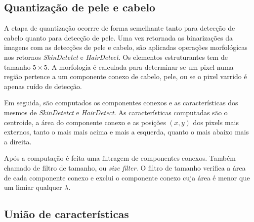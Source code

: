 \documentclass[journal,onecolumn]{IEEEtran}
\begin{document}
	\subsection{Quantização de pele e cabelo}
	
	A etapa de quantização ocorrre de forma semelhante tanto para detecção de cabelo quanto para detecção de pele.
	Uma vez retornada as binarizações da imagens com as detecções de pele e cabelo, são aplicadas operações morfológicas nos retornos \textit{SkinDetetct} e \textit{HairDetect}.
 	Os elementos estruturantes tem de tamanho $5\times 5$.
	A morfologia é calculada para determinar se um pixel numa região pertence a um componente conexo de cabelo, pele, ou se o pixel varrido é apenas ruído de detecção.
	
	Em seguida, são computados os componentes conexos e as características dos mesmos de \textit{SkinDetetct} e \textit{HairDetect}.
	As características computadas são o centroide, a área do componente conexo e as posições $(x,y)$ dos pixels mais externos, tanto o mais mais acima e mais a esquerda, quanto o mais abaixo mais a direita.
	
	Após a computação é feita uma filtragem de componentes conexos.
	Também chamado de filtro de tamanho, ou \textit{size filter}.
	O filtro de tamanho verifica a área de cada componente conexo e exclui o componente conexo cuja área é menor que um limiar qualquer $\lambda$.
	
	\subsection{União de características}	
	
\end{document}
